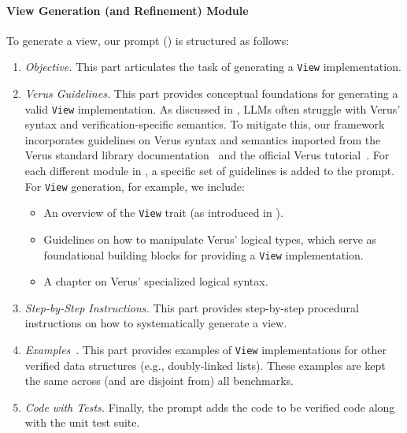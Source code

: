 \paragraph{View Generation (and Refinement) Module}
To generate a view, our prompt () is structured as follows:
\begin{enumerate}
\item \emph{Objective.} This part articulates the task of generating a \texttt{View} implementation.%
\item \emph{Verus Guidelines.}  This part provides conceptual foundations for generating a valid \texttt{View} implementation.
    As discussed in , LLMs often struggle with Verus' syntax and verification-specific semantics. To mitigate this, our framework incorporates guidelines on Verus syntax and semantics imported from the Verus standard library documentation~\cite{verus-stdlib} and the official Verus tutorial~\cite{verus-tutorial}. For each different module in \toolname{}, a specific set of guidelines is added to the prompt. For \texttt{View} generation, for example, we include:
    \begin{itemize}
    \item An overview of the \texttt{View} trait (as introduced in ).  
    \item Guidelines on how to manipulate Verus' logical types, which serve as foundational building blocks for providing a \texttt{View} implementation.  
    \item A chapter on Verus' specialized logical syntax.%
    \end{itemize}

    \item \emph{Step-by-Step Instructions.} This part provides step-by-step procedural instructions on how to systematically generate a view.
    \item \emph{Examples}~\cite{incontextlearning}. This part provides examples of \texttt{View} implementations for other verified data structures (e.g., doubly-linked lists). These examples are kept the same across (and are disjoint from) all benchmarks.%
    \item \emph{Code with Tests.} Finally, the prompt adds the code to be verified code along with the unit test suite.
\end{enumerate}


